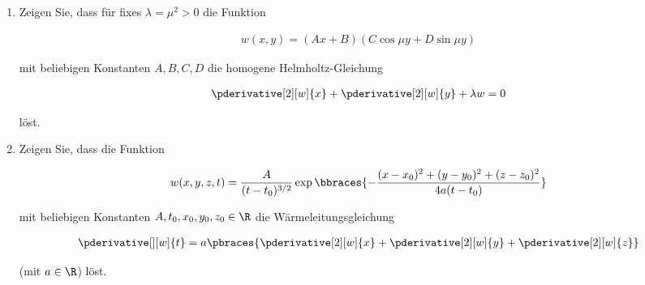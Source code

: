 
\begin{exercise}

\phantom{}

\begin{enumerate}[label = (\roman*)]

    \item Zeigen Sie, dass für fixes $\lambda = \mu^2 > 0$ die Funktion

    \begin{align*}
        w(x, y) = (Ax + B)(C \cos{\mu y} + D \sin{\mu y})
    \end{align*}

    mit beliebigen Konstanten $A, B, C, D$ die homogene Helmholtz-Gleichung

    \begin{align*}
        \pderivative[2][w]{x}
        +
        \pderivative[2][w]{y}
        +
        \lambda w = 0
    \end{align*}

    löst.

    \item Zeigen Sie, dass die Funktion
    
    \begin{align*}
        w(x, y, z, t)
        =
        \frac{A}{(t - t_0)^{3/2}}
        \exp
        {
            \bbraces
            {
                -\frac
                {
                    (x - x_0)^2
                    +
                    (y - y_0)^2
                    +
                    (z - z_0)^2
                }{
                    4 a (t - t_0)
                }
            }
        }
    \end{align*}

    mit beliebigen Konstanten $A, t_0, x_0, y_0, z_0 \in \R$ die Wärmeleitungsgleichung

    \begin{align*}
        \pderivative[][w]{t}
        =
        a \pbraces
        {
            \pderivative[2][w]{x}
            +
            \pderivative[2][w]{y}
            +
            \pderivative[2][w]{z}
        }
    \end{align*}

    (mit $a \in \R$) löst.

\end{enumerate}

\end{exercise}

